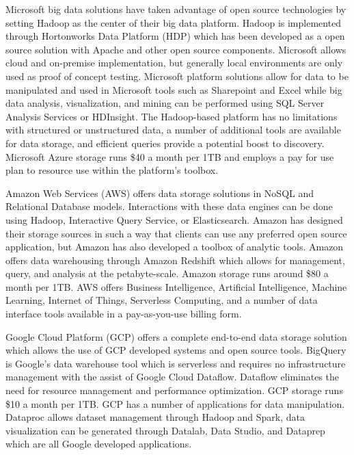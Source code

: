 \documentclass[sigconf]{acmart}
\begin{document}
Microsoft big data solutions have taken advantage of open source technologies by setting Hadoop as the center of their big data platform. Hadoop is implemented through Hortonworks Data Platform (HDP) which has been developed as a open source solution with Apache and other open source components. Microsoft allows cloud and on-premise implementation, but generally local environments are only used as proof of concept testing. Microsoft platform solutions allow for data to be manipulated and used in Microsoft tools such as Sharepoint and Excel while big data analysis, visualization, and mining can be performed using SQL Server Analysis Services or HDInsight. The Hadoop-based platform has no limitations with structured or unstructured data, a number of additional tools are available for data storage, and efficient queries provide a potential boost to discovery. Microsoft Azure storage runs \$40 a month per 1TB and employs a pay for use plan to resource use within the platform's toolbox\cite{www-msdn}.

Amazon Web Services (AWS) offers data storage solutions in NoSQL and Relational Database models. Interactions with these data engines can be done using Hadoop, Interactive Query Service, or Elasticsearch. Amazon has designed their storage sources in such a way that clients can use any preferred open source application, but Amazon has also developed a toolbox of analytic tools. Amazon offers data warehousing through Amazon Redshift which allows for management, query, and analysis at the petabyte-scale. Amazon storage runs around \$80 a month per 1TB. AWS offers Business Intelligence, Artificial Intelligence, Machine Learning, Internet of Things, Serverless Computing, and a number of data interface tools available in a pay-as-you-use billing form\cite{www-aws}. 

Google Cloud Platform (GCP) offers a complete end-to-end data storage solution which allows the use of GCP developed systems and open source tools. BigQuery is Google's data warehouse tool which is serverless and requires no infrastructure management with the assist of Google Cloud Dataflow. Dataflow eliminates the need for resource management and performance optimization. GCP storage runs \$10 a month per 1TB. GCP has a number of applications for data manipulation. Dataproc allows dataset management through Hadoop and Spark, data visualization can be generated through Datalab, Data Studio, and Dataprep which are all Google developed applications\cite{www-gcp}.
\end{document}
